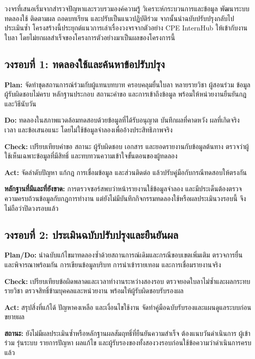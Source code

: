 วงจรที่เสนอเริ่มจากสำรวจปัญหาและรวบรวมองค์ความรู้ วิเคราะห์กระบวนการและข้อมูล พัฒนาระบบ ทดลองใช้ ติดตามผล ถอดบทเรียน และปรับเป็นแนวปฏิบัติร่วม จากนั้นนำฉบับปรับปรุงกลับไปประเมินซ้ำ โครงสร้างนี้ประยุกต์แนวการเล่าเรื่องวงจรจากตัวอย่าง CPE InternHub ให้เข้ากับงานใบลา โดยไม่ยกผลสำเร็จของโครงการตัวอย่างมาเป็นผลของโครงการนี้

\subsection*{วงรอบที่ 1: ทดลองใช้และค้นหาข้อปรับปรุง}
\textbf{Plan:} จัดทำชุดสถานการณ์ร่วมกับผู้แทนบทบาท ครอบคลุมยื่นใบลา หลายรายวิชา ผู้สอนร่วม ข้อมูลผู้รับผิดชอบไม่ครบ หลักฐานประกอบ สถานะคำขอ และการเข้าถึงข้อมูล พร้อมให้หน่วยงานยืนยันกฎและวิธีนับวัน

\textbf{Do:} ทดลองในสภาพแวดล้อมทดสอบด้วยข้อมูลที่ได้รับอนุญาต บันทึกผลที่คาดหวัง ผลที่เกิดจริง เวลา และข้อเสนอแนะ โดยไม่ใช้ข้อมูลจำลองเพื่ออ้างประสิทธิภาพจริง

\textbf{Check:} เปรียบเทียบคำขอ สถานะ ผู้รับผิดชอบ เอกสาร และยอดรายงานกับข้อมูลต้นทาง ตรวจว่าผู้ใช้เห็นเฉพาะข้อมูลที่มีสิทธิ์ และทบทวนความเข้าใจขั้นตอนของผู้ทดลอง

\textbf{Act:} จัดลำดับปัญหา แก้กฎ การเชื่อมข้อมูล และส่วนติดต่อ แล้วปรับคู่มือกับกรณีทดสอบให้ตรงกัน

\noindent\textbf{หลักฐานที่มีและที่ยังขาด:} การตรวจซอร์สพบว่าหน้ารายงานใช้ข้อมูลจำลอง และมีประเด็นต้องตรวจความครบถ้วนข้อมูลกับกฎการทำงาน แต่ยังไม่มีบันทึกกิจกรรมทดลองใช้หรือผลประเมินวงรอบนี้ จึงไม่ถือว่าปิดวงรอบแล้ว

\subsection*{วงรอบที่ 2: ประเมินฉบับปรับปรุงและยืนยันผล}
\textbf{Plan/Do:} นำฉบับแก้ไขมาทดลองซ้ำด้วยสถานการณ์เดิมและกรณีขอบเขตเพิ่มเติม ตรวจการยื่นและพิจารณาพร้อมกัน การเขียนข้อมูลบริบท การนำเข้ารายเทอม และการเชื่อมรายงานจริง

\textbf{Check:} เปรียบเทียบข้อผิดพลาดและเวลาทำงานระหว่างสองรอบ ตรวจยอดใบลาไม่ซ้ำและผลกระทบรายวิชา ตรวจสิทธิ์ข้ามบุคคลและหน่วยงาน พร้อมให้ผู้รับผิดชอบรับรองผล

\textbf{Act:} สรุปสิ่งที่แก้ได้ ปัญหาคงเหลือ และเงื่อนไขใช้งาน จัดทำคู่มือฉบับรับรองและแผนดูแลระบบก่อนขยายผล

\noindent\textbf{สถานะ:} ยังไม่มีผลประเมินซ้ำหรือหลักฐานผลสัมฤทธิ์ที่ยืนยันความสำเร็จ ต้องแนบวันดำเนินการ ผู้เข้าร่วม รุ่นระบบ รายการปัญหา ผลแก้ไข และผู้รับรองของทั้งสองวงรอบก่อนใช้ข้อความว่าดำเนินการครบแล้ว
